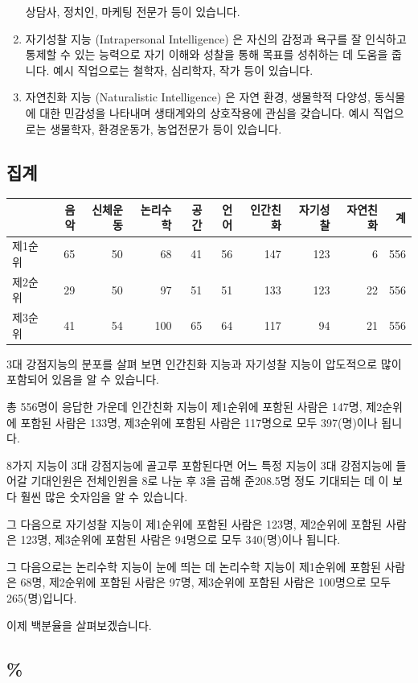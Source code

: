 \documentclass[
]{book}
\begin{document}
\begin{enumerate}
상담사, 정치인, 마케팅 전문가 등이 있습니다.
\item
  자기성찰 지능 (Intrapersonal Intelligence) 은 자신의 감정과 욕구를 잘 인식하고 통제할 수 있는 능력으로 자기 이해와 성찰을 통해 목표를 성취하는 데 도움을 줍니다. 예시 직업으로는 철학자, 심리학자, 작가 등이 있습니다.
\item
  자연친화 지능 (Naturalistic Intelligence) 은 자연 환경, 생물학적 다양성, 동식물에 대한 민감성을 나타내며 생태계와의 상호작용에 관심을 갖습니다. 예시 직업으로는 생물학자, 환경운동가, 농업전문가 등이 있습니다.
\end{enumerate}

\subsection{집계}\label{uxc9d1uxacc4-57}

\begin{tabular}{l|r|r|r|r|r|r|r|r|r}
\hline
  & 음악 & 신체운동 & 논리수학 & 공간 & 언어 & 인간친화 & 자기성찰 & 자연친화 & 계\\
\hline
제1순위 & 65 & 50 & 68 & 41 & 56 & 147 & 123 & 6 & 556\\
\hline
제2순위 & 29 & 50 & 97 & 51 & 51 & 133 & 123 & 22 & 556\\
\hline
제3순위 & 41 & 54 & 100 & 65 & 64 & 117 & 94 & 21 & 556\\
\hline
\end{tabular}

3대 강점지능의 분포를 살펴 보면 인간친화 지능과 자기성찰 지능이 압도적으로 많이 포함되어 있음을 알 수 있습니다.

총 556명이 응답한 가운데 인간친화 지능이 제1순위에 포함된 사람은 147명, 제2순위에 포함된 사람은 133명, 제3순위에 포함된 사람은 117명으로 모두 397(명)이나 됩니다.

8가지 지능이 3대 강점지능에 골고루 포함된다면 어느 특정 지능이 3대 강점지능에 들어갈 기대인원은 전체인원을 8로 나눈 후 3을 곱해 준208.5명 정도 기대되는 데 이 보다 훨씬 많은 숫자임을 알 수 있습니다.

그 다음으로
자기성찰 지능이 제1순위에 포함된 사람은 123명, 제2순위에 포함된 사람은 123명, 제3순위에 포함된 사람은 94명으로 모두 340(명)이나 됩니다.

그 다음으로는 논리수학 지능이 눈에 띄는 데 논리수학 지능이 제1순위에 포함된 사람은 68명, 제2순위에 포함된 사람은 97명, 제3순위에 포함된 사람은 100명으로 모두 265(명)입니다.

이제 백분율을 살펴보겠습니다.

\subsection{\%}\label{section-30}
\end{document}

